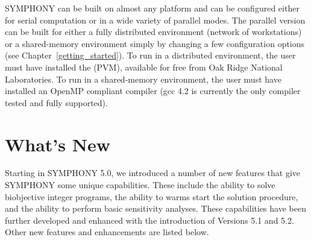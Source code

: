 SYMPHONY can be built on almost any platform and can be configured either for
serial computation or in a wide variety of parallel modes. The parallel
version can be built for either a fully distributed environment (network of
workstations) or a shared-memory environment simply by changing a few
configuration options (see Chapter~\ref{getting_started}). To run in a
distributed environment, the user must have installed the {\em
{}}
(PVM), available for free from Oak Ridge National Laboratories. To run in a
shared-memory environment, the user must have installed an OpenMP compliant
compiler (gcc 4.2 is currently the only compiler tested and fully supported).

\section{What's New}

Starting in SYMPHONY 5.0, we introduced a number of new features that give
SYMPHONY some unique capabilities. These include the ability to solve
biobjective integer programs, the ability to warms start the solution
procedure, and the ability to perform basic sensitivity analyses. These
capabilities have been further developed and enhanced with the introduction of
Versions 5.1 and 5.2. Other new features and enhancements are listed below.

